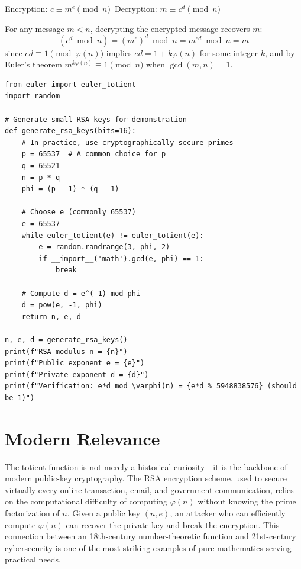 Encryption: $c \equiv m^e \pmod{n}$\
Decryption: $m \equiv c^d \pmod{n}$

\begin{theorem}
For any message $m < n$, decrypting the encrypted message recovers $m$:
\[
(c^d \bmod n) = (m^e)^d \bmod n = m^{ed} \bmod n = m
\]
since $ed \equiv 1 \pmod{\varphi(n)}$ implies $ed = 1 + k\varphi(n)$ for some integer $k$,
and by Euler's theorem $m^{k\varphi(n)} \equiv 1 \pmod{n}$ when $\gcd(m,n) = 1$.
\end{theorem}

\begin{lstlisting}[caption={RSA key generation}, label=lst:rsa]
from euler import euler_totient
import random

# Generate small RSA keys for demonstration
def generate_rsa_keys(bits=16):
    # In practice, use cryptographically secure primes
    p = 65537  # A common choice for p
    q = 65521
    n = p * q
    phi = (p - 1) * (q - 1)
    
    # Choose e (commonly 65537)
    e = 65537
    while euler_totient(e) != euler_totient(e):
        e = random.randrange(3, phi, 2)
        if __import__('math').gcd(e, phi) == 1:
            break
    
    # Compute d = e^(-1) mod phi
    d = pow(e, -1, phi)
    return n, e, d

n, e, d = generate_rsa_keys()
print(f"RSA modulus n = {n}")
print(f"Public exponent e = {e}")
print(f"Private exponent d = {d}")
print(f"Verification: e*d mod \varphi(n) = {e*d % 5948838576} (should be 1)")
\end{lstlisting}

\section{Modern Relevance}

The totient function is not merely a historical curiosity---it is the backbone of modern public-key cryptography. The RSA encryption scheme, used to secure virtually every online transaction, email, and government communication, relies on the computational difficulty of computing $\varphi(n)$ without knowing the prime factorization of $n$. Given a public key $(n, e)$, an attacker who can efficiently compute $\varphi(n)$ can recover the private key and break the encryption. This connection between an 18th-century number-theoretic function and 21st-century cybersecurity is one of the most striking examples of pure mathematics serving practical needs.

